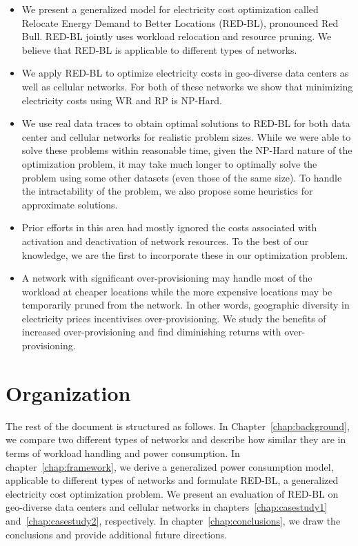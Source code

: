 \begin{itemize}
\item We present a generalized model for electricity cost optimization called Relocate Energy Demand to Better Locations (RED-BL), pronounced Red Bull. RED-BL jointly uses workload relocation and resource pruning. We believe that RED-BL is applicable to different types of networks. 
\item %
We apply RED-BL to optimize electricity costs in geo-diverse data centers as well as cellular networks. For both of these networks we show that minimizing electricity costs using WR and RP is NP-Hard.
\item We use real data traces to obtain optimal solutions to RED-BL for both data center and cellular networks for realistic problem sizes. While we were able to solve these problems within reasonable time, given the NP-Hard nature of the optimization problem, it may take much longer to optimally solve the problem using some other datasets (even those of the same size). To handle the intractability of the problem, we also propose some heuristics for approximate solutions. 
\item Prior efforts in this area had mostly ignored the costs associated with activation and deactivation of network resources. To the best of our knowledge, we are the first to incorporate these in our optimization problem.
\item A network with significant over-provisioning may handle most of the workload at cheaper locations while the more expensive locations may be temporarily pruned from the network. In other words, geographic diversity in electricity prices incentivises over-provisioning. We study the benefits of increased over-provisioning and find diminishing returns with over-provisioning.
\end{itemize}

\section{Organization} The rest of the document is structured as follows. In Chapter~\ref{chap:background}, we compare two different types of networks and describe how similar they are in terms of workload handling and power consumption. In chapter~\ref{chap:framework}, we derive a generalized power consumption model, applicable to different types of networks and formulate RED-BL, a generalized electricity cost optimization problem. We present an evaluation of RED-BL on geo-diverse data centers and cellular networks in chapters~\ref{chap:casestudy1} and~\ref{chap:casestudy2}, respectively. In chapter~\ref{chap:conclusions}, we draw the conclusions and provide additional future directions.